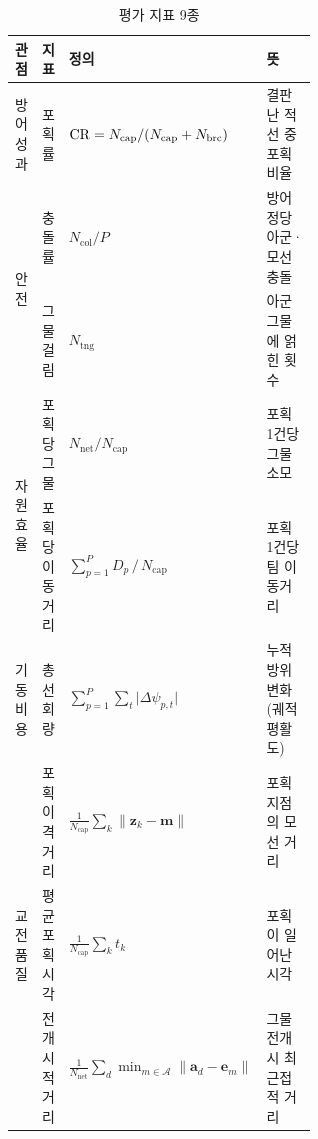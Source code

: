 \begin{table}[!b]
\centering
\caption{평가 지표 9종}
\label{tab:metrics}
\footnotesize
\renewcommand{\arraystretch}{1.25}
\begin{tabular}{llp{0.30\linewidth}p{0.30\linewidth}}
\toprule
관점 & 지표 & 정의 & 뜻 \\
\midrule
방어 성과
 & 포획률           & $\mathrm{CR} = N_\mathrm{cap} / (N_\mathrm{cap} + N_\mathrm{brc})$ & 결판난 적선 중 포획 비율 \\
\midrule
\multirow{2}{*}{안전}
 & 충돌률           & $N_\mathrm{col} / P$ & 방어정당 아군·모선 충돌 \\
 & 그물 걸림        & $N_\mathrm{tng}$ & 아군 그물에 얽힌 횟수 \\
\midrule
\multirow{2}{*}{자원 효율}
 & 포획당 그물      & $N_\mathrm{net} / N_\mathrm{cap}$ & 포획 1건당 그물 소모 \\
 & 포획당 이동거리  & $\sum_{p=1}^{P} D_p \,/\, N_\mathrm{cap}$ & 포획 1건당 팀 이동거리 \\
\midrule
기동 비용
 & 총 선회량        & $\sum_{p=1}^{P} \sum_{t} \lvert \Delta\psi_{p,t} \rvert$ & 누적 방위 변화(궤적 평활도) \\
\midrule
\multirow{3}{*}{교전 품질}
 & 포획 이격거리    & $\frac{1}{N_\mathrm{cap}} \sum_{k} \lVert \mathbf{z}_k - \mathbf{m} \rVert$ & 포획 지점의 모선 거리 \\
 & 평균 포획 시각   & $\frac{1}{N_\mathrm{cap}} \sum_{k} t_k$ & 포획이 일어난 시각 \\
 & 전개 시 적 거리  & $\frac{1}{N_\mathrm{net}} \sum_{d} \min_{m \in \mathcal{A}} \lVert \mathbf{a}_d - \mathbf{e}_m \rVert$ & 그물 전개 시 최근접 적 거리 \\
\bottomrule
\end{tabular}
\end{table}
